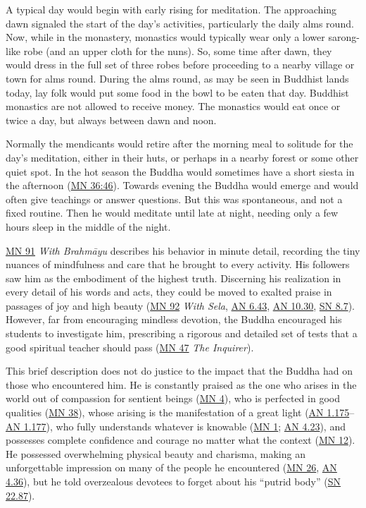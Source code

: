 \documentclass[12pt,openany]{book}%
\begin{document}
A typical day would begin with early rising for meditation. The approaching dawn signaled the start of the day’s activities, particularly the daily alms round. Now, while in the monastery, monastics would typically wear only a lower sarong-like robe (and an upper cloth for the nuns). So, some time after dawn, they would dress in the full set of three robes before proceeding to a nearby village or town for alms round. During the alms round, as may be seen in Buddhist lands today, lay folk would put some food in the bowl to be eaten that day. Buddhist monastics are not allowed to receive money. The monastics would eat once or twice a day, but always between dawn and noon.

Normally the mendicants would retire after the morning meal to solitude for the day’s meditation, either in their huts, or perhaps in a nearby forest or some other quiet spot. In the hot season the Buddha would sometimes have a short siesta in the afternoon (\href{https://suttacentral.net/mn36\#46}{MN 36:46}). Towards evening the Buddha would emerge and would often give teachings or answer questions. But this was spontaneous, and not a fixed routine. Then he would meditate until late at night, needing only a few hours sleep in the middle of the night.

\href{https://suttacentral.net/mn91}{MN 91} \textit{With \textsanskrit{Brahmāyu}} describes his behavior in minute detail, recording the tiny nuances of mindfulness and care that he brought to every activity. His followers saw him as the embodiment of the highest truth. Discerning his realization in every detail of his words and acts, they could be moved to exalted praise in passages of joy and high beauty (\href{https://suttacentral.net/mn92}{MN 92} \textit{With Sela}, \href{https://suttacentral.net/an6.43}{AN 6.43}, \href{https://suttacentral.net/an10.30}{AN 10.30}, \href{https://suttacentral.net/sn8.7}{SN 8.7}). However, far from encouraging mindless devotion, the Buddha encouraged his students to investigate him, prescribing a rigorous and detailed set of tests that a good spiritual teacher should pass (\href{https://suttacentral.net/mn47}{MN 47} \textit{The Inquirer}).

This brief description does not do justice to the impact that the Buddha had on those who encountered him. He is constantly praised as the one who arises in the world out of compassion for sentient beings (\href{https://suttacentral.net/mn4}{MN 4}), who is perfected in good qualities (\href{https://suttacentral.net/mn38}{MN 38}), whose arising is the manifestation of a great light (\href{https://suttacentral.net/an1.175}{AN 1.175}–\href{https://suttacentral.net/an1.177}{AN 1.177}), who fully understands whatever is knowable (\href{https://suttacentral.net/mn1}{MN 1}; \href{https://suttacentral.net/an4.23}{AN 4.23}), and possesses complete confidence and courage no matter what the context (\href{https://suttacentral.net/mn12}{MN 12}). He possessed overwhelming physical beauty and charisma, making an unforgettable impression on many of the people he encountered (\href{https://suttacentral.net/mn26}{MN 26}, \href{https://suttacentral.net/an4.36}{AN 4.36}), but he told overzealous devotees to forget about his “putrid body” (\href{https://suttacentral.net/sn22.87}{SN 22.87}).
\end{document}
